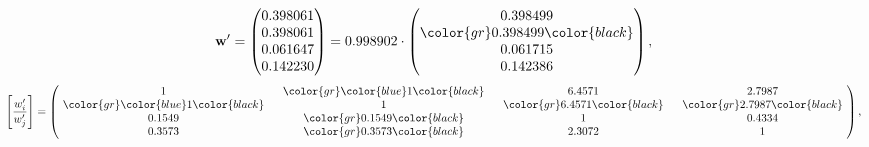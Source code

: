 \begin{example}
\begin{equation*}
\mathbf{w}^{\prime} =
\begin{pmatrix}
0.398061\\
0.398061\\
0.061647\\
0.142230
\end{pmatrix} =
0.998902\cdot
\begin{pmatrix}
0.398499\\
\color{gr} 0.398499\color{black} \\
0.061715\\
0.142386
\end{pmatrix},
\end{equation*}
\begin{equation*}
\left[ \frac{{w}^{\prime}_i}{{w}^{\prime}_j} \right] =
\begin{pmatrix}
$\,\,$ 1 $\,\,$ & $\,\,$\color{gr} \color{blue} 1\color{black} $\,\,$ & $\,\,$6.4571$\,\,$ & $\,\,$2.7987$\,\,$ \\
$\,\,$\color{gr} \color{blue} 1\color{black} $\,\,$ & $\,\,$ 1 $\,\,$ & $\,\,$\color{gr} 6.4571\color{black} $\,\,$ & $\,\,$\color{gr} 2.7987\color{black}   $\,\,$ \\
$\,\,$0.1549$\,\,$ & $\,\,$\color{gr} 0.1549\color{black} $\,\,$ & $\,\,$ 1 $\,\,$ & $\,\,$0.4334 $\,\,$ \\
$\,\,$0.3573$\,\,$ & $\,\,$\color{gr} 0.3573\color{black} $\,\,$ & $\,\,$2.3072$\,\,$ & $\,\,$ 1  $\,\,$ \\
\end{pmatrix},
\end{equation*}
\end{example}
\newpage

